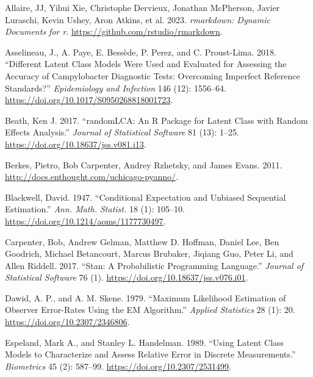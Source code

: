 \hypertarget{refs}{}
\begin{CSLReferences}{1}{0}
\leavevmode{}%
Allaire, JJ, Yihui Xie, Christophe Dervieux, Jonathan McPherson, Javier Luraschi, Kevin Ushey, Aron Atkins, et al. 2023. \emph{{rmarkdown}: Dynamic Documents for r}. \url{https://github.com/rstudio/rmarkdown}.

\leavevmode{}%
Asselineau, J., A. Paye, E. Bessède, P. Perez, and C. Proust-Lima. 2018. {``Different Latent Class Models Were Used and Evaluated for Assessing the Accuracy of Campylobacter Diagnostic Tests: Overcoming Imperfect Reference Standards?''} \emph{Epidemiology and Infection} 146 (12): 1556--64. \url{https://doi.org/10.1017/S0950268818001723}.

\leavevmode{}%
Beath, Ken J. 2017. {``{randomLCA}: {An} {R} {Package} for {Latent} {Class} with {Random} {Effects} {Analysis}.''} \emph{Journal of Statistical Software} 81 (13): 1--25. \url{https://doi.org/10.18637/jss.v081.i13}.

\leavevmode{}%
Berkes, Pietro, Bob Carpenter, Andrey Rzhetsky, and James Evans. 2011. \url{http://docs.enthought.com/uchicago-pyanno/}.

\leavevmode{}%
Blackwell, David. 1947. {``Conditional Expectation and Unbiased Sequential Estimation.''} \emph{Ann. Math. Statist.} 18 (1): 105--10. \url{https://doi.org/10.1214/aoms/1177730497}.

\leavevmode{}%
Carpenter, Bob, Andrew Gelman, Matthew D. Hoffman, Daniel Lee, Ben Goodrich, Michael Betancourt, Marcus Brubaker, Jiqiang Guo, Peter Li, and Allen Riddell. 2017. {``Stan: {A} {Probabilistic} {Programming} {Language}.''} \emph{Journal of Statistical Software} 76 (1). \url{https://doi.org/10.18637/jss.v076.i01}.

\leavevmode{}%
Dawid, A. P., and A. M. Skene. 1979. {``Maximum {Likelihood} {Estimation} of {Observer} {Error}-{Rates} {Using} the {EM} {Algorithm}.''} \emph{Applied Statistics} 28 (1): 20. \url{https://doi.org/10.2307/2346806}.

\leavevmode{}%
Espeland, Mark A., and Stanley L. Handelman. 1989. {``Using Latent Class Models to Characterize and Assess Relative Error in Discrete Measurements.''} \emph{Biometrics} 45 (2): 587--99. \url{https://doi.org/10.2307/2531499}.


\end{CSLReferences}
